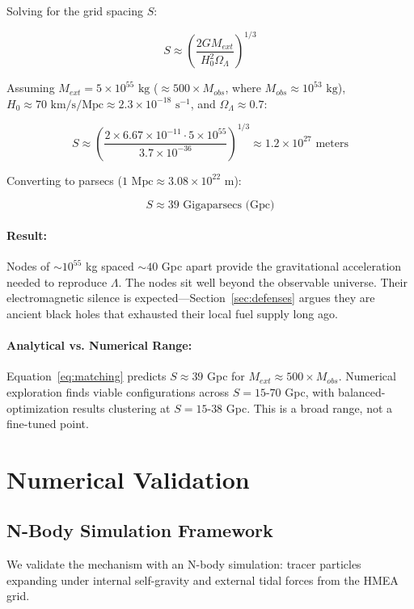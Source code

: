 \documentclass{article}
\begin{document}
Solving for the grid spacing $S$:

\begin{equation}
S \approx \left( \frac{2 G M_{ext}}{H_0^2 \Omega_\Lambda} \right)^{1/3}
\end{equation}

Assuming $M_{ext} = 5 \times 10^{55} \text{ kg}$ ($\approx 500 \times M_{obs}$, where $M_{obs} \approx 10^{53} \text{ kg}$), $H_0 \approx 70 \text{ km/s/Mpc} \approx 2.3 \times 10^{-18} \text{ s}^{-1}$, and $\Omega_\Lambda \approx 0.7$:

\begin{equation}
S \approx \left( \frac{2 \times 6.67 \times 10^{-11} \cdot 5 \times 10^{55}}{3.7 \times 10^{-36}} \right)^{1/3} \approx 1.2 \times 10^{27} \text{ meters}
\end{equation}

Converting to parsecs ($1 \text{ Mpc} \approx 3.08 \times 10^{22} \text{ m}$):

\begin{equation}
S \approx 39 \text{ Gigaparsecs (Gpc)}
\end{equation}

\paragraph{Result:} Nodes of $\sim 10^{55}$ kg spaced $\sim 40$ Gpc apart provide the gravitational acceleration needed to reproduce $\Lambda$.
The nodes sit well beyond the observable universe.
Their electromagnetic silence is expected—Section~\ref{sec:defenses} argues they are ancient black holes that exhausted their local fuel supply long ago.

\paragraph{Analytical vs. Numerical Range:}
Equation~\ref{eq:matching} predicts $S \approx 39$ Gpc for $M_{ext} \approx 500 \times M_{obs}$.
Numerical exploration finds viable configurations across $S = 15$-$70$ Gpc, with balanced-optimization results clustering at $S = 15$-$38$ Gpc. This is a broad range, not a fine-tuned point.

\section{Numerical Validation}
\label{sec:numerical}

\subsection{N-Body Simulation Framework}
\label{sec:framework}
We validate the mechanism with an N-body simulation: tracer particles expanding under internal self-gravity and external tidal forces from the HMEA grid.
\end{document}
